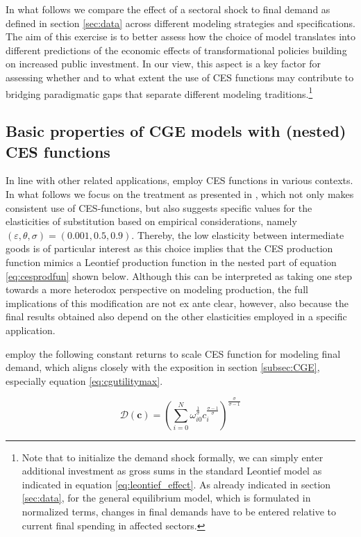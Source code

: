\documentclass{article}
\begin{document}
In what follows we compare the effect of a sectoral shock to final demand as defined in section \ref{sec:data} across different modeling strategies and specifications. The aim of this exercise is to better assess how the choice of model translates into different predictions of the economic effects of transformational policies building on increased public investment. In our view, this aspect is a key factor for assessing whether and to what extent the use of CES functions may contribute to bridging paradigmatic gaps that separate different modeling traditions.\footnote{Note that to initialize the demand shock formally, we can simply enter additional investment as gross sums in the standard Leontief model as indicated in equation \eqref{eq:leontief_effect}. As already indicated in section \ref{sec:data}, for the general equilibrium model, which is formulated in normalized terms, changes in final demands have to be entered relative to current final spending in affected sectors.}

\subsection{Basic properties of CGE models with (nested) CES functions} \label{subsec:introducingCES}

In line with other related applications, \citet{BF2019, BF2022} employ CES functions in various contexts. In what follows we focus on the treatment as presented in \citet{BF2019}, which not only makes consistent use of CES-functions, but also suggests specific values for the elasticities of substitution based on empirical considerations, namely $(\varepsilon,\theta,\sigma) = (0.001,0.5,0.9)$. Thereby, the low elasticity between intermediate goods is of particular interest as this choice implies that the CES production function mimics a Leontief production function in the nested part of equation \eqref{eq:cesprodfun} shown below. Although this can be interpreted as taking one step towards a more heterodox perspective on modeling production, the full implications of this modification are not ex ante clear, however, also because the final results obtained also depend on the other elasticities employed in a specific application.

\citet{BF2019} employ the following constant returns to scale CES function for modeling final demand, which aligns closely with the exposition in section \ref{subsec:CGE}, especially equation \eqref{eq:cgutilitymax}.

\begin{equation}
    \label{eq:cesdemand}
    \mathcal D(\mathbf c)= \left( \sum_{i=0}^N \omega_{i0}^{\frac 1 \sigma} c_i^{\frac {\sigma-1}{\sigma}} \right)^{\frac {\sigma}{\sigma-1}}
\end{equation}
\end{document}
